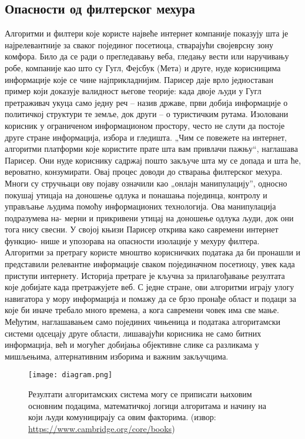 \documentclass[a4paper]{article}
\begin{document}
\subsection{Опасности од филтерског мехура}
\label{subsec:podnaslov5}

Алгоритми и филтери које користе највеће интернет компаније показују шта је најрелевантније за сваког појединог посетиоца, стварајући својеврсну зону комфора. Било да се ради о прегледавању веба, гледању вести или наручивању робе, компаније као што су Гугл, Фејсбук (Мета) и друге, нуде корисницима информације које се чине најприкладнијим. Парисер даје врло једноставан пример који доказује валидност његове теорије: када двоје људи у Гугл претраживач укуца само једну реч – назив државе, први добија информације о политичкој структури те земље, док други – о туристичким рутама. Изоловани корисник у ограниченом информационом простору, често не слути да постоје друге стране информација, избора и гледишта. „Чим се повежете на интернет, алгоритми платформи које користите прате шта вам привлачи пажњу“, наглашава Парисер. Они нуде кориснику садржај пошто закључе шта му се допада и шта ће, вероватно, конзумирати. Овај процес доводи до стварања филтерског мехура. Многи су стручњаци ову појаву означили као „онлајн манипулацију”, односно покушај утицаја на доношење одлука и понашања појединца, контролу и управљање људима помоћу информационих технологија\cite{susser}. Ова манипулација подразумева на-
мерни и прикривени утицај на доношење одлука људи, док они тога нису свесни. У својој књизи Парисер открива како савремени интернет функцио-
нише и упозорава на опасности изолације у мехуру филтера. Алгоритми за претрагу користе мноштво корисничких података да би пронашли и представили релевантне информације сваком појединачном посетиоцу, увек када приступи интернету. Историја претраге је кључна за прилагођавање резултата које добијате када претражујете веб. С једне стране, ови алгоритми играју улогу навигатора у мору информација и помажу да се брзо пронађе област и подаци за које би иначе требало много времена, а кога савремени човек има све мање. Међутим, наглашавањем само појединих чињеница и података алгоритамски системи одсецају друге области, лишавајући корисника не само битних информација, већ и могућег добијања објективне слике са разликама у мишљењима, алтернативним изборима и важним закључцима.

\begin{figure}[hbt!]
\centering
\texttt{[image: diagram.png]}
\caption{Резултати алгоритамских система могу се приписати њиховим основним подацима, математичкој логици алгоритама и начину на који људи комуницирају са овим факторима. (извор: \url{https://www.cambridge.org/core/books})}
\end{figure}
\end{document}
